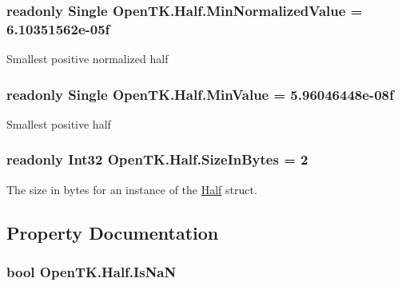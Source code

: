 \hypertarget{struct_open_t_k_1_1_half_abda2208f9300afdd617d8d4ac320d21f}{
\subsubsection[{Min\-Normalized\-Value}]{\setlength{\rightskip}{0pt plus 5cm}readonly Single Open\-T\-K.\-Half.\-Min\-Normalized\-Value = 6.\-10351562e-\/05f\hspace{0.3cm}{\ttfamily [static]}}}\label{struct_open_t_k_1_1_half_abda2208f9300afdd617d8d4ac320d21f}


Smallest positive normalized half

\hypertarget{struct_open_t_k_1_1_half_afb6cea32ac0dd56fe8455d730d8fbde1}{
\subsubsection[{Min\-Value}]{\setlength{\rightskip}{0pt plus 5cm}readonly Single Open\-T\-K.\-Half.\-Min\-Value = 5.\-96046448e-\/08f\hspace{0.3cm}{\ttfamily [static]}}}\label{struct_open_t_k_1_1_half_afb6cea32ac0dd56fe8455d730d8fbde1}


Smallest positive half

\hypertarget{struct_open_t_k_1_1_half_abe15fc6db4ae97079233802277b8bcad}{
\subsubsection[{Size\-In\-Bytes}]{\setlength{\rightskip}{0pt plus 5cm}readonly Int32 Open\-T\-K.\-Half.\-Size\-In\-Bytes = 2\hspace{0.3cm}{\ttfamily [static]}}}\label{struct_open_t_k_1_1_half_abe15fc6db4ae97079233802277b8bcad}


The size in bytes for an instance of the \hyperlink{struct_open_t_k_1_1_half}{Half} struct.



\subsection{Property Documentation}
\hypertarget{struct_open_t_k_1_1_half_a929c5a6b04acc0e21e106e35b0d296c2}{
\subsubsection[{Is\-Na\-N}]{\setlength{\rightskip}{0pt plus 5cm}bool Open\-T\-K.\-Half.\-Is\-Na\-N\hspace{0.3cm}{\ttfamily [get]}}}\label{struct_open_t_k_1_1_half_a929c5a6b04acc0e21e106e35b0d296c2}



